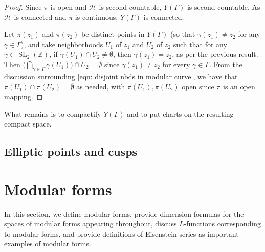 \documentclass[10pt,leqno,twoside]{article}
\theoremstyle{plain}
\theoremstyle{definition}
\numberwithin{equation}{section}
\numberwithin{lem}{section}
\newcommand{\textib}[1]{\textbf{\textit{#1\index{#1}}}} %
\DeclareMathOperator{\SL}{SL}
\newcommand{\slz}{\SL_2(\mathbb{Z})}
\newcommand{\tbd}{{\Huge\color{red}{\textib{TBD}}}}
\begin{document}
\begin{proof}
    Since $\pi$ is open and $\mathcal H$ is second-countable, $Y(\varGamma)$ is second-countable. As $\mathcal H$ is connected and $\pi$ is continuous, $Y(\varGamma)$ is connected.

    Let $\pi(z_1)$ and $\pi(z_2)$ be distinct points in $Y(\varGamma)$ (so that $\gamma(z_1)\neq z_2$ for any $\gamma\in \varGamma$), and take neighborhoods $U_1$ of $z_1$ and $U_2$ of $z_2$ such that for any $\gamma\in \slz$, if $\gamma(U_1)\cap U_2\neq \emptyset$, then $\gamma(z_1) = z_2$, as per the previous result. Then $\big(\bigcap_{\gamma\in\varGamma}\gamma(U_1)\big)\cap U_2 = \emptyset$ since $\gamma(z_1)\neq z_2$ for every $\gamma\in \varGamma$. From the discussion surrounding \cref{eqn: disjoint nbds in modular curve}, we have that $\pi(U_1)\cap\pi(U_2) = \emptyset$ as needed, with $\pi(U_1),\pi(U_2)$ open since $\pi$ is an open mapping.
\end{proof}

What remains is to compactify $Y(\varGamma)$ and to put charts on the resulting compact space. \tbd


\subsection{Elliptic points and cusps}

\newpage\section{Modular forms}
In this section, we define modular forms, provide dimension formulas for the spaces of modular forms appearing throughout, discuss $L$-functions corresponding to modular forms, and provide definitions of Eisenstein series as important examples of modular forms.
\end{document}
